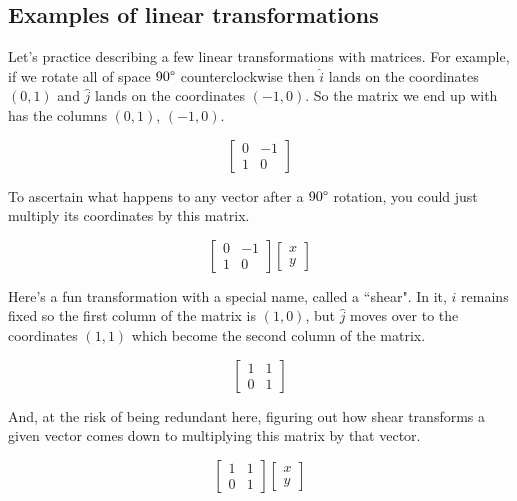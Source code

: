 \subsection{Examples of linear transformations}

Let's practice describing a few linear transformations with matrices. For
example, if we rotate all of space $90\degree$ counterclockwise then $\hat{i}$
lands on the coordinates $(0, 1)$ and $\hat{j}$ lands on the coordinates
$(-1, 0)$. So the matrix we end up with has the columns $(0, 1)$, $(-1, 0)$.

\begin{equation*}
  \begin{bmatrix}
    0 & -1 \\
    1 & 0
  \end{bmatrix}
\end{equation*}

To ascertain what happens to any vector after a $90\degree$ rotation, you could
just multiply its coordinates by this matrix.

\begin{equation*}
  \begin{bmatrix}
    0 & -1 \\
    1 & 0
  \end{bmatrix} \begin{bmatrix}
    x \\
    y
  \end{bmatrix}
\end{equation*}

Here's a fun transformation with a special name, called a ``shear". In it,
$\hat{i}$ remains fixed so the first column of the matrix is $(1, 0)$, but
$\hat{j}$ moves over to the coordinates $(1, 1)$ which become the second column
of the matrix.

\begin{equation*}
  \begin{bmatrix}
    1 & 1 \\
    0 & 1
  \end{bmatrix}
\end{equation*}

And, at the risk of being redundant here, figuring out how shear transforms a
given vector comes down to multiplying this matrix by that vector.

\begin{equation*}
  \begin{bmatrix}
    1 & 1 \\
    0 & 1
  \end{bmatrix} \begin{bmatrix}
    x \\
    y
  \end{bmatrix}
\end{equation*}

